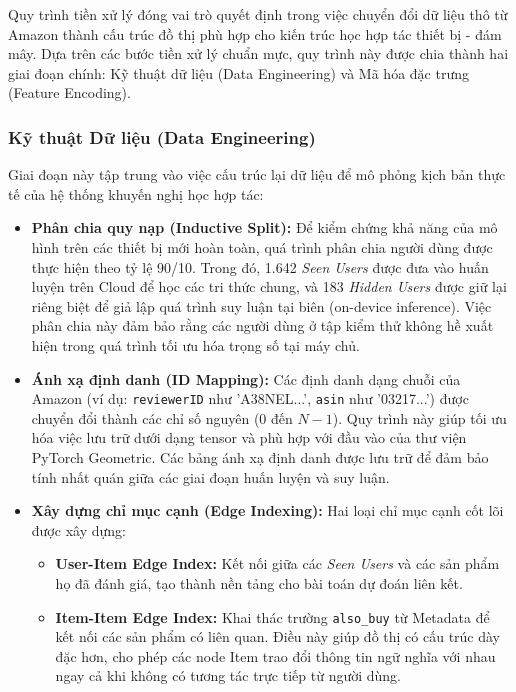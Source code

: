 Quy trình tiền xử lý đóng vai trò quyết định trong việc chuyển đổi dữ liệu thô từ Amazon thành cấu trúc đồ thị phù hợp cho kiến trúc học hợp tác thiết bị - đám mây. Dựa trên các bước tiền xử lý chuẩn mực, quy trình này được chia thành hai giai đoạn chính: Kỹ thuật dữ liệu (Data Engineering) và Mã hóa đặc trưng (Feature Encoding).

\subsubsection{Kỹ thuật Dữ liệu (Data Engineering)}

Giai đoạn này tập trung vào việc cấu trúc lại dữ liệu để mô phỏng kịch bản thực tế của hệ thống khuyến nghị học hợp tác:

\begin{itemize}
    \item \textbf{Phân chia quy nạp (Inductive Split):} Để kiểm chứng khả năng của mô hình trên các thiết bị mới hoàn toàn, quá trình phân chia người dùng được thực hiện theo tỷ lệ 90/10. Trong đó, 1.642 \textit{Seen Users} được đưa vào huấn luyện trên Cloud để học các tri thức chung, và 183 \textit{Hidden Users} được giữ lại riêng biệt để giả lập quá trình suy luận tại biên (on-device inference). Việc phân chia này đảm bảo rằng các người dùng ở tập kiểm thử không hề xuất hiện trong quá trình tối ưu hóa trọng số tại máy chủ.
    
    \item \textbf{Ánh xạ định danh (ID Mapping):} Các định danh dạng chuỗi của Amazon (ví dụ: \texttt{reviewerID} như 'A38NEL...', \texttt{asin} như '03217...') được chuyển đổi thành các chỉ số nguyên (0 đến $N-1$). Quy trình này giúp tối ưu hóa việc lưu trữ dưới dạng tensor và phù hợp với đầu vào của thư viện PyTorch Geometric. Các bảng ánh xạ định danh được lưu trữ để đảm bảo tính nhất quán giữa các giai đoạn huấn luyện và suy luận.
    
    \item \textbf{Xây dựng chỉ mục cạnh (Edge Indexing):} Hai loại chỉ mục cạnh cốt lõi được xây dựng:
    \begin{itemize}
        \item \textbf{User-Item Edge Index:} Kết nối giữa các \textit{Seen Users} và các sản phẩm họ đã đánh giá, tạo thành nền tảng cho bài toán dự đoán liên kết.
        \item \textbf{Item-Item Edge Index:} Khai thác trường \texttt{also\_buy} từ Metadata để kết nối các sản phẩm có liên quan. Điều này giúp đồ thị có cấu trúc dày đặc hơn, cho phép các node Item trao đổi thông tin ngữ nghĩa với nhau ngay cả khi không có tương tác trực tiếp từ người dùng.
    \end{itemize}
\end{itemize}

